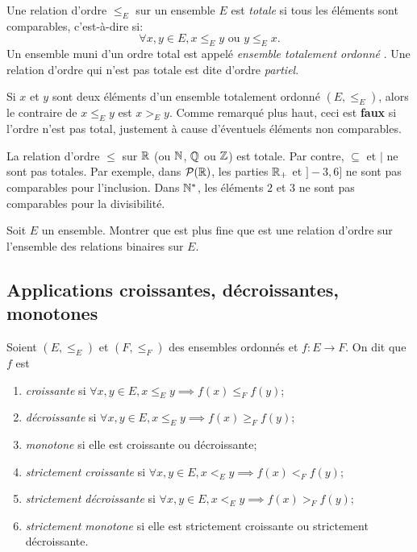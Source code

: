 \begin{definition}
Une relation d'ordre $\leq_E$ sur un ensemble $E$ est \emph{totale} si tous les éléments sont comparables, c'est-à-dire si:
\[ \forall x, y\in E, x\leq_Ey\text{ ou } y\leq_E x.\]
Un ensemble muni d'un ordre total est appelé \emph{ensemble totalement ordonné} . Une relation d'ordre qui n'est pas totale est dite d'ordre \emph{partiel}.
\end{definition}

\begin{remarque}
Si $x$ et $y$ sont deux éléments d'un ensemble totalement ordonné $(E,\leq_E)$, alors le contraire de $x\leq_E y$ est $x>_E y$. Comme remarqué plus haut, ceci est \textbf{faux} si l'ordre n'est pas total, justement à cause d'éventuels éléments non comparables. 
\end{remarque}

\begin{exemples}
La relation d'ordre $\leq$ sur $\mathbb{R}$ (ou $\mathbb{N}$, $\mathbb{Q}$ ou  $\mathbb{Z}$) est totale. Par contre, $\subseteq$ et $|$ ne sont pas totales. Par exemple, dans $\mathcal P(\mathbb{R})$, les parties $\mathbb{R}_+$ et $]-3,6]$ ne sont pas comparables pour l'inclusion. Dans $\mathbb{N}^*$, les éléments $2$ et $3$ ne sont pas comparables pour la divisibilité.
\end{exemples}

\begin{exercice}
Soit $E$ un ensemble. Montrer que \og est plus fine que\fg{} est une relation d'ordre sur l'ensemble des relations binaires sur $E$.
\end{exercice}

\subsection{Applications croissantes, décroissantes, monotones}


\begin{definition}
Soient $(E,\leq_E)$ et $(F,\leq_F)$ des ensembles ordonnés et $f : E\to F$. On dit que $f$ est 
\begin{enumerate}
\item \emph{croissante} si $\forall x, y\in E, x\leq_E y \implies f(x) \leq_F f(y)$;
\item \emph{décroissante} si $\forall x, y\in E, x\leq_E y \implies f(x) \geq_F f(y)$;
\item \emph{monotone} si elle est croissante ou décroissante;
\item \emph{strictement croissante} si $\forall x, y\in E, x<_E y \implies f(x) <_F f(y)$;
\item \emph{strictement décroissante} si $\forall x, y\in E, x<_E y \implies f(x) >_F f(y)$;
\item \emph{strictement monotone} si elle est strictement croissante ou strictement décroissante.
\end{enumerate}
\end{definition}

